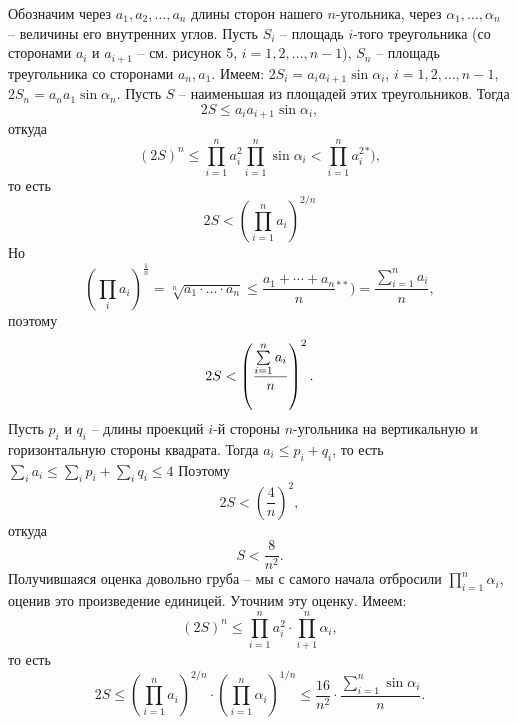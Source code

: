 \begin{minipage}[t]{0.65\linewidth}
	Обозначим через $a_1, a_2, \ldots, a_n$ длины сторон нашего $n$-угольника,
	через $\alpha_1, \ldots, \alpha_n$ -- величины его внутренних углов.
	Пусть $S_i$ -- площадь $i$-того треугольника (со
	сторонами $a_i$ и $a_{i+1}$ -- см. рисунок 5, $i = 1, 2, \ldots, n - 1$),
	$S_n$ -- площадь треугольника со сторонами $a_n, a_1$.
	Имеем: $2S_i=a_ia_{i+1}\sin{\alpha_i}$, $i = 1, 2, \ldots, n - 1$,
	$2S_n=a_na_1\sin{\alpha_n}$.
	Пусть $S$ -- наименьшая из площадей этих треугольников. Тогда
	$$2S \leqslant a_ia_{i+1}\sin{\alpha_i},$$
	откуда
	$$\left(2S\right)^n \leqslant \prod\limits_{i = 1}^n{a_i^2}
	\prod\limits_{i = 1}^n\sin{\alpha_i} < \prod\limits_{i=1}^n{a_i^2}{}^{*}),$$
	то есть
	$$2S < \left(\prod\limits_{i=1}^n{a_i}\right)^{2/n}$$
	Но
	$$\left(\prod\limits_{i}{a_i}\right)^{\frac{1}{n}} = \sqrt[n]
	{a_1 \cdot \ldots \cdot a_n} \leqslant \frac{a_1 + \cdots + a_n}{n}{}^{**})
	= \frac{\sum\limits_{i=1}^n{a_i}}{n},$$
	поэтому
	$$2S < \left({{\sum\limits_{i = 1}^n{a_i}}\over {n}}\right)^2.$$
	Пусть $p_i$ и $q_i$ -- длины проекций $i$-й стороны $n$-угольника на
	вертикальную и горизонтальную стороны квадрата. Тогда $a_i \leqslant
	p_i + q_i$, то есть $\sum\limits_i{a_i} \leqslant \sum\limits_i{p_i} 
	+ \sum\limits_i{q_i} \leqslant 4$
	\newline
	Поэтому
	$$2S < \left(\frac{4}{n}\right)^2,$$
	откуда
	$$S < \frac{8}{n^2}.$$
	\tab Получившаяся оценка довольно груба -- мы с самого начала отбросили
	$\prod\limits_{i=1}^n{\alpha_i}$, оценив это произведение единицей.
	Уточним эту оценку. Имеем:
	$$\left(2S\right)^n \leqslant \prod\limits_{i=1}^n{a_i^2}
	\cdot \prod\limits_{i+1}^n{\alpha_i},$$
	то есть
	$$2S \leqslant \left(\prod\limits_{i=1}^n{a_i}\right)^{2/n}
	\cdot \left(\prod\limits_{i=1}^n{\alpha_i}\right)^{1/n} \leqslant 
	\frac {16} {n^2} \cdot \frac {\sum\limits_{i=1}^n{\sin{\alpha_i}}}{n}.$$
	
\end{minipage}

